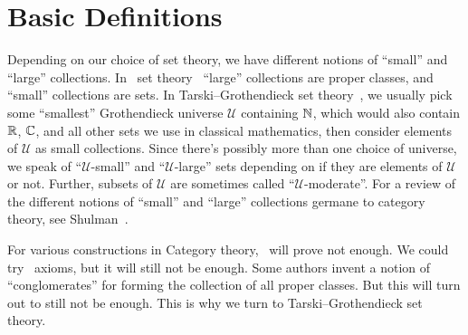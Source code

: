\section{Basic Definitions}

\begin{node}\label{cat-0002}%
Depending on our choice of set theory, we have different notions of
``small'' and ``large'' collections. In \NBG\ set theory~
``large'' collections are proper classes, and ``small'' collections are
sets. In Tarski--Grothendieck set theory~,
we usually pick some ``smallest'' Grothendieck universe $\mathcal{U}$
containing $\mathbb{N}$, which would also contain $\mathbb{R}$, $\mathbb{C}$, and all other
sets we use in classical mathematics, then consider elements of
$\mathcal{U}$ as small collections. Since there's possibly more than one
choice of universe, we speak of ``$\mathcal{U}$-small'' and
``$\mathcal{U}$-large'' sets depending on if they are elements of
$\mathcal{U}$ or not. Further, subsets of $\mathcal{U}$ are sometimes
called ``$\mathcal{U}$-moderate''. For a review of the different notions
of ``small'' and ``large'' collections germane to category theory, see
Shulman~\cite{shulman2008set}.

For various constructions in Category theory, \NBG\ will prove not
enough. We could try \MK\ axioms, but it will still not be enough. Some
authors invent a notion of ``conglomerates'' for forming the collection
of all proper classes. But this will turn out to still not be enough. This
is why we turn to Tarski--Grothendieck set theory.
\end{node}

